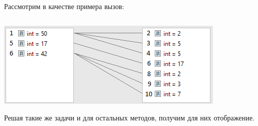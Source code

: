 \begin{frame}
\frametitle{\insertsection} 
\framesubtitle{\insertsubsection}
Рассмотрим в качестве примера вызов:
\inputminted{java}{code/FlatMapFactorizeExample.java}
\includegraphics[scale=0.8]{img/flatMapExample.png}

Решая такие же задачи и для остальных методов, получим для них отображение.
\end{frame}
